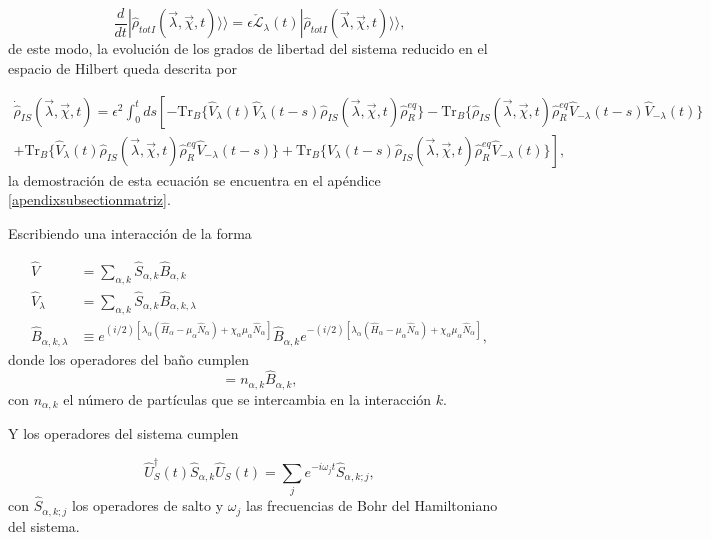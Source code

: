 \begin{equation}
    \frac{d}{dt}|\hat{\rho}_{totI}(\vec{\lambda},\vec{\chi},t)\rangle \rangle  = \epsilon \check{\mathcal{L}}_{\lambda}(t)|\hat{\rho}_{totI}(\vec{\lambda},\vec{\chi},t)\rangle \rangle,
 \label{sec2FCS:evolution}
\end{equation}
de este modo, la evolución de los grados de libertad del sistema reducido en el espacio de Hilbert queda descrita por 

\begin{multline}
    \dot{\hat{\rho}}_{IS}(\vec{\lambda},\vec{\chi},t) =  \epsilon^{2}\int_{0}^{t}ds \left[- \text{Tr}_{B}\{\hat{V}_{\lambda}(t)\hat{V}_{\lambda}(t-s)\hat{\rho}_{IS}(\vec{\lambda},\vec{\chi},t)\hat{\rho}^{eq}_{R} \} - \text{Tr}_{B}\{\hat{\rho}_{IS}(\vec{\lambda},\vec{\chi},t)\hat{\rho}^{eq}_{R}\hat{V}_{-\lambda}(t-s)\hat{V}_{-\lambda}(t) \} \right.\\
    \left. + \text{Tr}_{B}\{\hat{V}_{\lambda}(t)\hat{\rho}_{IS}(\vec{\lambda},\vec{\chi},t)\hat{\rho}^{eq}_{R}\hat{V}_{-\lambda}(t-s) \} + \text{Tr}_{B}\{ \hat{V}_{\lambda}(t-s)\hat{\rho}_{IS}(\vec{\lambda},\vec{\chi},t)\hat{\rho}^{eq}_{R}\hat{V}_{-\lambda}(t) \}  \right],
\label{ecmaestraVlambda}
\end{multline}
la demostración de esta ecuación se encuentra en el apéndice \ref{apendixsubsectionmatriz}.

Escribiendo una interacción de la forma

\begin{align*}
    \hat{V} & = \sum_{\alpha,k}\hat{S}_{\alpha,k}\hat{B}_{\alpha,k} \\
    \hat{V}_{\lambda} & = \sum_{\alpha,k}\hat{S}_{\alpha,k}\hat{B}_{\alpha,k,\lambda} \\
    \hat{B}_{\alpha,k,\lambda} & \equiv e^{(i/2)[\lambda_{\alpha}(\hat{H}_{\alpha} - \mu_{\alpha}\hat{N}_{\alpha}) + \chi_{\alpha}\mu_{\alpha}\hat{N}_{\alpha}]}\hat{B}_{\alpha,k}e^{-(i/2)[\lambda_{\alpha}(\hat{H}_{\alpha} - \mu_{\alpha}\hat{N}_{\alpha}) + \chi_{\alpha}\mu_{\alpha}\hat{N}_{\alpha}]},  
\end{align*}
donde los operadores del baño cumplen  
\begin{equation*}
    [\hat{B}_{\alpha,k},\hat{N}_{\alpha}] = n_{\alpha,k}\hat{B}_{\alpha,k},
\end{equation*}
con $n_{\alpha,k}$ el número de part\'iculas que se intercambia en la interacción $k$.
 
Y los operadores del sistema cumplen

\begin{equation*}
    \hat{U}^{\dagger}_{S}(t)\hat{S}_{\alpha,k}\hat{U}_{S}(t) = \sum_{j}e^{-i\omega_{j}t}\hat{S}_{\alpha,k;j},
\end{equation*}
con $\hat{S}_{\alpha,k;j}$ los operadores de salto y $\omega_{j}$ las frecuencias de Bohr del Hamiltoniano del sistema.

